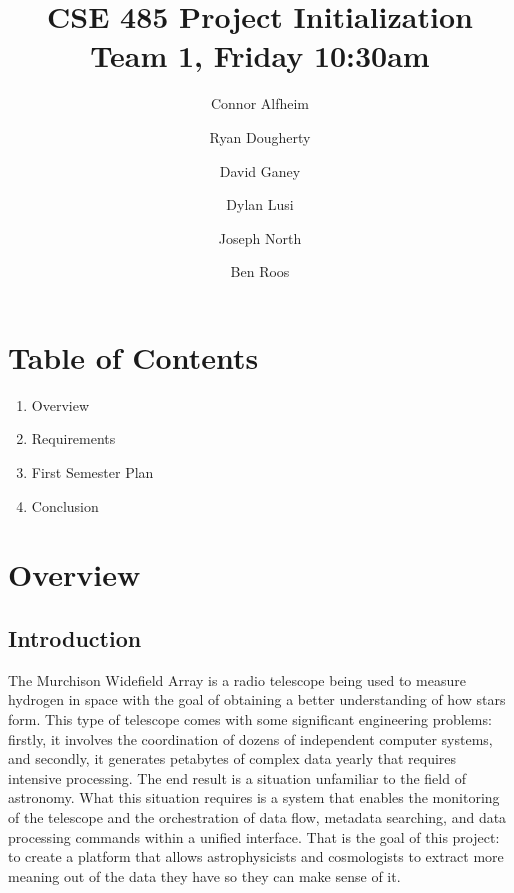 \documentclass[12pt]{article}
\begin{document}
\begin{spacing}{.4}
\setlength{\droptitle}{-7em}
\title{CSE 485 Project Initialization \\ Team 1, Friday 10:30am}
\author{Connor Alfheim \and Ryan Dougherty \and David Ganey \and Dylan Lusi \and Joseph North \and Ben Roos}
\maketitle
\newpage
\end{spacing}

\begin{spacing}{1.5}

\section*{Table of Contents}
\begin{enumerate}
\item Overview
\item Requirements
\item First Semester Plan
\item Conclusion
\end{enumerate}
\newpage

\section{Overview}
\subsection{Introduction}
The Murchison Widefield Array is a radio telescope being used to measure hydrogen in space with the goal of obtaining a better understanding of how stars form. This type of telescope comes with some significant engineering problems: firstly, it involves the coordination of dozens of independent computer systems, and secondly, it generates petabytes of complex data yearly that requires intensive processing. The end result is a situation unfamiliar to the field of astronomy. What this situation requires is a system that enables the monitoring of the telescope and the orchestration of data flow, metadata searching, and data processing commands within a unified interface. That is the goal of this project: to create a platform that allows astrophysicists and cosmologists to extract more meaning out of the data they have so they can make sense of it.


\end{spacing}
\end{document}
